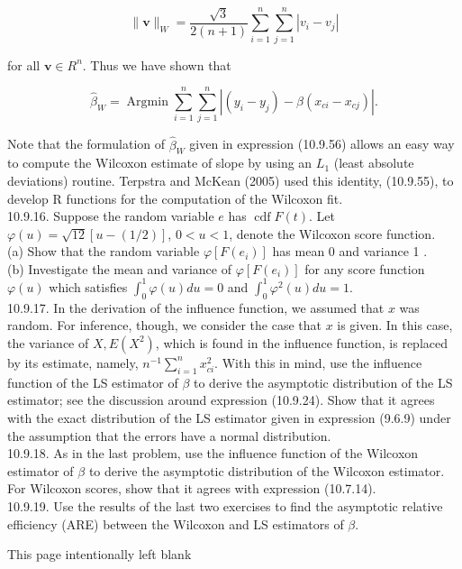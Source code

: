 \begin{equation*}
\|\mathbf{v}\|_{W}=\frac{\sqrt{3}}{2(n+1)} \sum_{i=1}^{n} \sum_{j=1}^{n}\left|v_{i}-v_{j}\right| \tag{10.9.55}
\end{equation*}


for all $\mathbf{v} \in R^{n}$. Thus we have shown that


\begin{equation*}
\widehat{\beta}_{W}=\operatorname{Argmin} \sum_{i=1}^{n} \sum_{j=1}^{n}\left|\left(y_{i}-y_{j}\right)-\beta\left(x_{c i}-x_{c j}\right)\right| . \tag{10.9.56}
\end{equation*}


Note that the formulation of $\widehat{\beta}_{W}$ given in expression (10.9.56) allows an easy way to compute the Wilcoxon estimate of slope by using an $L_{1}$ (least absolute deviations) routine. Terpstra and McKean (2005) used this identity, (10.9.55), to develop R functions for the computation of the Wilcoxon fit.\\
10.9.16. Suppose the random variable $e$ has $\operatorname{cdf} F(t)$. Let $\varphi(u)=\sqrt{12}[u-(1 / 2)]$, $0<u<1$, denote the Wilcoxon score function.\\
(a) Show that the random variable $\varphi\left[F\left(e_{i}\right)\right]$ has mean 0 and variance 1 .\\
(b) Investigate the mean and variance of $\varphi\left[F\left(e_{i}\right)\right]$ for any score function $\varphi(u)$ which satisfies $\int_{0}^{1} \varphi(u) d u=0$ and $\int_{0}^{1} \varphi^{2}(u) d u=1$.\\
10.9.17. In the derivation of the influence function, we assumed that $x$ was random. For inference, though, we consider the case that $x$ is given. In this case, the variance of $X, E\left(X^{2}\right)$, which is found in the influence function, is replaced by its estimate, namely, $n^{-1} \sum_{i=1}^{n} x_{c i}^{2}$. With this in mind, use the influence function of the LS estimator of $\beta$ to derive the asymptotic distribution of the LS estimator; see the discussion around expression (10.9.24). Show that it agrees with the exact distribution of the LS estimator given in expression (9.6.9) under the assumption that the errors have a normal distribution.\\
10.9.18. As in the last problem, use the influence function of the Wilcoxon estimator of $\beta$ to derive the asymptotic distribution of the Wilcoxon estimator. For Wilcoxon scores, show that it agrees with expression (10.7.14).\\
10.9.19. Use the results of the last two exercises to find the asymptotic relative efficiency (ARE) between the Wilcoxon and LS estimators of $\beta$.

This page intentionally left blank
